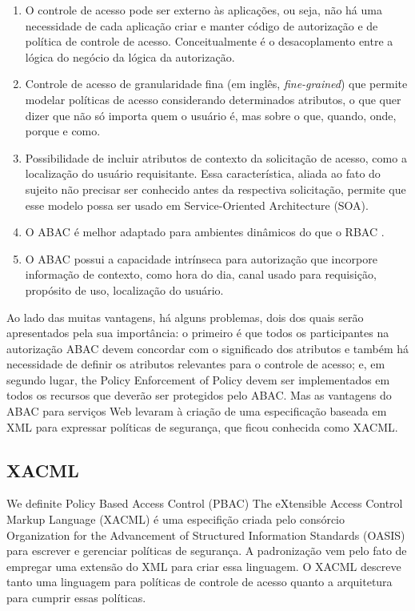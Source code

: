 \documentclass{doublecol-new}
\begin{document}
\begin{enumerate}
	\item O controle de acesso pode ser externo às aplicações, ou seja, não há uma necessidade de cada aplicação criar e manter código de autorização e de política de controle de acesso. Conceitualmente é o desacoplamento entre a lógica do negócio da lógica da autorização.
	\item Controle de acesso de granularidade fina (em inglês, \textit{fine-grained}) que permite modelar políticas de acesso considerando determinados atributos, o que quer dizer que não só importa quem o usuário é, mas sobre o que, quando, onde, porque e como.
	\item Possibilidade de incluir atributos de contexto da solicitação de acesso, como a localização do usuário requisitante. Essa característica, aliada ao fato do sujeito não precisar ser conhecido antes da respectiva solicitação, permite que esse modelo possa ser usado em Service-Oriented Architecture (SOA).
	\item O ABAC é melhor adaptado para ambientes dinâmicos do que o RBAC \cite{yuan2005attributed} \cite{huABAC2014guide}.
	\item O ABAC possui a capacidade intrínseca para autorização que incorpore informação de contexto, como hora do dia, canal usado para requisição, propósito de uso, localização do usuário.
\end{enumerate}
Ao lado das muitas vantagens, há alguns problemas, dois dos quais serão apresentados pela sua importância: o primeiro é que todos os participantes na autorização ABAC devem concordar com o significado dos atributos \cite{karp2010abac} \cite{Rubio-Medrano2015federated} e também há necessidade de definir os atributos relevantes para o controle de acesso; e, em segundo lugar, the Policy Enforcement of Policy devem ser implementados em todos os recursos que deverão ser protegidos pelo ABAC. Mas as vantagens do ABAC para serviços Web levaram à criação de uma especificação baseada em XML para expressar políticas de segurança, que ficou conhecida como XACML.

\subsection{XACML}
We definite Policy Based Access Control (PBAC) 
The eXtensible Access Control Markup Language (XACML)\cite{rissanen2013extensible} é uma especifição criada pelo consórcio Organization for the Advancement of Structured Information Standards (OASIS) para escrever e gerenciar políticas de segurança. A padronização vem pelo fato de empregar uma extensão do XML para criar essa linguagem. O XACML descreve tanto uma linguagem para políticas de controle de acesso quanto a arquitetura para cumprir essas políticas.
\end{document}
